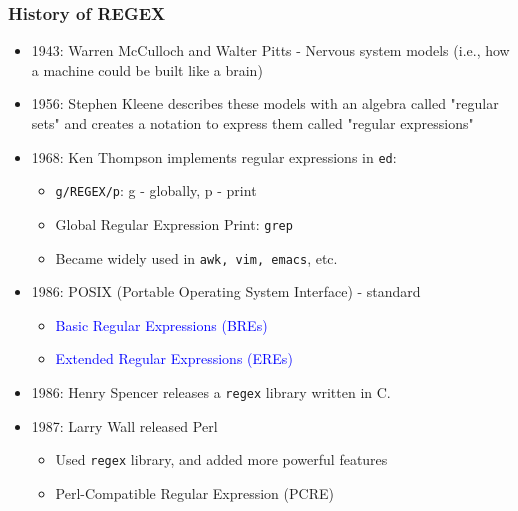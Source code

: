 \documentclass[red]{beamer}
\begin{document}
\begin{CJK*}{UTF8}{gbsn}
\begin{frame}
\frametitle{History of REGEX}
\begin{itemize}
	\item 1943: Warren McCulloch and Walter Pitts - Nervous system models 
		(i.e., how a machine could be built like a brain)
	\item 1956: Stephen Kleene describes these models with an algebra 
		called "regular sets" and creates a notation to express them 
		called "regular expressions"
	\item 1968: Ken Thompson implements regular expressions in \texttt{ed}:
	\begin{itemize}
		\item \texttt{g/REGEX/p}: g - globally, p - print
		\item Global Regular Expression Print: \texttt{grep}
		\item Became widely used in \texttt{awk, vim, emacs}, etc.
	\end{itemize}
	\item 1986: POSIX (Portable Operating System Interface) - standard
	\begin{itemize}
		\item \textcolor{blue}{Basic Regular Expressions (BREs)}
		\item \textcolor{blue}{Extended Regular Expressions (EREs)}
	\end{itemize}	
	\item 1986: Henry Spencer releases a \texttt{regex} library written in C.
	\item 1987: Larry Wall released Perl
	\begin{itemize}
		\item Used \texttt{regex} library, and added more powerful features
		\item Perl-Compatible Regular Expression (PCRE)
	\end{itemize}
\end{itemize}
\end{frame}



\end{CJK*}
\end{document}
